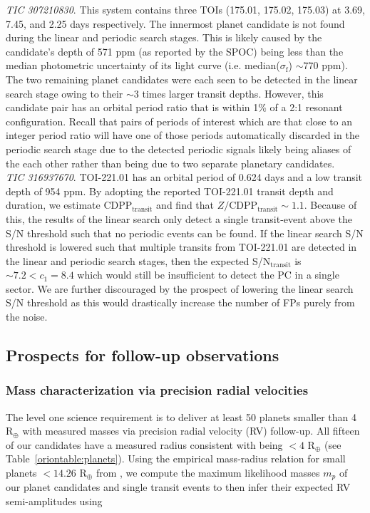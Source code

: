 \emph{TIC 307210830}. This system contains three TOIs (175.01, 175.02, 175.03) at 3.69, 7.45,
and 2.25 days respectively. The innermost planet candidate is not found during the linear and
periodic search stages. This is likely caused by the candidate's depth of 571 ppm
(as reported by the SPOC) being less than the median photometric uncertainty of
its light curve (i.e. median($\sigma_{\text{f}}$) $\sim 770$ ppm). The two remaining planet candidates were each seen
to be detected in the \pipeline{} linear search stage owing to their $\sim 3$ times larger
transit depths. However, this candidate pair has an orbital period ratio that is within 1\%
of a 2:1 resonant configuration. Recall that pairs of periods of interest which are that close to
an integer period ratio will have one of those periods automatically discarded in the periodic search
stage due to the detected periodic signals likely being aliases of the each other rather than being
due to two separate planetary candidates. \\


\emph{TIC 316937670}. TOI-221.01 has an orbital period of 0.624 days and a low transit depth
of 954 ppm. By adopting the reported TOI-221.01 transit depth and duration, we estimate
CDPP$_{\text{transit}}$ and find that $Z/\text{CDPP}_{\text{transit}} \sim 1.1$. Because of this,
the results of the \pipeline{} linear search only detect
a single transit-event above the S/N threshold such that
no periodic events can be found. If the linear search S/N threshold is lowered
such that multiple transits from TOI-221.01 are detected in the linear and periodic search stages, then
the expected S/N$_{\text{transit}}$ is $\sim 7.2 < c_1 = 8.4$ which would still be insufficient to detect the PC in
a single \tess{} sector. We are further discouraged by the prospect of lowering the linear search S/N
threshold as this would drastically increase the number of FPs purely from the noise. \\

\subsection{Prospects for follow-up observations}
\subsubsection{Mass characterization via precision radial velocities} \label{sect:rv}
The \tess{} level one science requirement is to deliver at least 50 planets smaller than 4
R$_{\oplus}$ with measured masses via precision radial velocity (RV) follow-up. All fifteen of our
candidates have a measured radius consistent with being $<4$ R$_{\oplus}$ (see Table~\ref{oriontable:planets}).
Using the empirical mass-radius relation for small planets $<14.26$ R$_{\oplus}$ from \cite{chen17},
we compute the maximum likelihood masses $m_p$ of our planet candidates and single transit events
to then infer their expected RV semi-amplitudes using 


